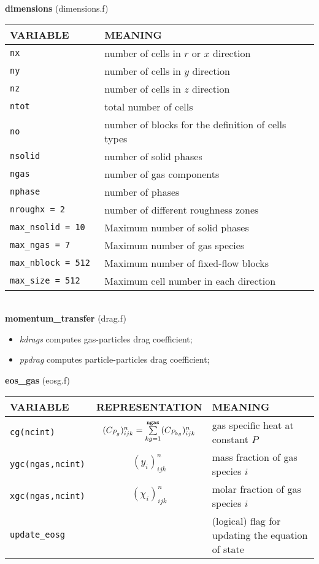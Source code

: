 %
%
{\large {\bf dimensions}} (dimensions.f)\\[5mm]
\begin{tabular}{|p{6cm}|p{6cm}|}\hline
VARIABLE & MEANING\\\hline
\tt  nx    & number of cells in $r$ or $x$ direction\\\hline
\tt  ny    & number of cells in $y$ direction\\\hline
\tt  nz    & number of cells in $z$ direction\\\hline
\tt  ntot  & total number of cells \\\hline
\tt  no   & number of blocks for the definition of cells types\\\hline
\tt  nsolid    & number of solid phases\\\hline
\tt  ngas   & number of gas components\\\hline
\tt  nphase & number of phases\\\hline
\tt  nroughx = 2 & number of different roughness zones\\\hline
\tt  max\_nsolid = 10 & Maximum number of solid phases\\\hline
\tt  max\_ngas = 7 & Maximum number of gas species \\\hline
\tt  max\_nblock = 512 & Maximum number of fixed-flow blocks\\\hline
\tt  max\_size = 512 & Maximum cell number in each direction\\\hline
\end{tabular}\\[5mm]
%
%
{\large{\bf momentum\_transfer}} (drag.f)\\
\begin{itemize}
\item{\em kdrags} computes gas-particles drag coefficient;
\item{\em ppdrag} computes particle-particles drag coefficient;
\end{itemize}
%
%
{\large {\bf eos\_gas}} (eosg.f)\\[5mm]
\begin{tabular}{|p{6cm}|c|p{6cm}|}\hline
VARIABLE & REPRESENTATION & MEANING\\\hline
\tt cg(ncint)          & $(C_{P_g})_{ijk}^n=\sum\limits_{kg=1}^{\tt ngas}(C_{P_{kg}})_{ijk}^n$ &  gas specific heat at constant $P$\\\hline
\tt ygc(ngas,ncint)    & $(y_i)_{ijk}^n$&  mass fraction of gas species $i$\\ \hline
\tt xgc(ngas,ncint)    & $(\chi_i)_{ijk}^n$&  molar fraction of gas species $i$\\ \hline
\tt update\_eosg       & & (logical) flag for updating the equation of state\\ \hline
\end{tabular}\\

